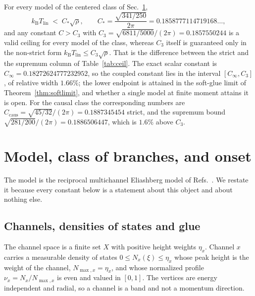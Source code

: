 \documentclass[aps,10pt,superscriptaddress,floatfix,amsmath,amssymb,nofootinbib]{revtex4-2}
\newcommand{\kb}{k_{\mathrm B}}
\newcommand{\Tlin}{T_{\mathrm{lin}}}
\newcommand{\Cinf}{C_\infty}
\newcommand{\Cthree}{C_{3}}
\newcommand{\Cstar}{C_{*}}
\newcommand{\Ccaus}{C_{\mathrm{caus}}}
\begin{document}
For every model of the centered class of Sec.~\ref{sec:model},
\begin{equation}\label{eq:headline}
\kb\Tlin\;<\;\Cstar\sqrt{\rho},\qquad
\Cstar=\frac{\sqrt{341/250}}{2\pi}=0.1858777114719168\ldots,
\end{equation}
and any constant $C>\Cthree$ with $\Cthree=\sqrt{6811/5000}/(2\pi)=0.1857550244$ is a
valid ceiling for every model of the class, whereas $\Cthree$ itself is guaranteed only in
the non-strict form $\kb\Tlin\le\Cthree\sqrt{\rho}$. That is the difference between the
strict and the supremum column of Table~\ref{tab:ceil}. The exact scalar constant is $\Cinf=0.18272624777232952$, so the
coupled constant lies in the interval $[\Cinf,\Cthree]$, of relative width $1.66\%$; the
lower endpoint is attained in the soft-glue limit of Theorem~\ref{thm:softlimit}, and
whether a single model at finite moment attains it is open. For the causal class the
corresponding numbers are $\Ccaus=\sqrt{45/32}/(2\pi)=0.1887345454$ strict, and the
supremum bound $\sqrt{281/200}/(2\pi)=0.1886506447$, which is $1.6\%$ above $\Cthree$.

\section{Model, class of branches, and onset}\label{sec:model}

The model is the reciprocal multichannel Eliashberg model of
Refs.~\cite{univglue,optimum,finiteenergy,anisosharp}. We restate it because every
constant below is a statement about this object and about nothing else.

\subsection{Channels, densities of states and glue}

The channel space is a finite set $X$ with positive height weights $\eta_x$. Channel $x$
carries a measurable density of states $0\le N_x(\xi)\le\eta_x$ whose peak height is the
weight of the channel, $N_{\max,x}=\eta_x$, and whose normalized profile
$\nu_x=N_x/N_{\max,x}$ is even and valued in $[0,1]$. The vertices are energy independent
and radial, so a channel is a band and not a momentum direction.
\end{document}
